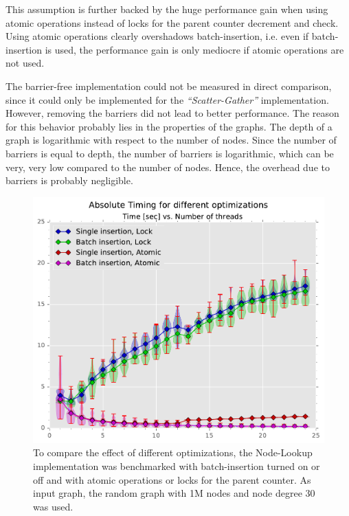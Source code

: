 This assumption is further backed by the huge performance gain when using atomic operations instead of locks for the parent counter decrement and check.
Using atomic operations clearly overshadows batch-insertion, i.e. even if batch-insertion is used, the performance gain is only mediocre if atomic operations are not used.

The barrier-free implementation could not be measured in direct comparison, since it could only be implemented for the \emph{``Scatter-Gather''} implementation.
However, removing the barriers did not lead to better performance. The reason for this behavior probably lies in the properties of the graphs.
The depth of a graph is logarithmic with respect to the number of nodes. Since the number of barriers is equal to depth, the number of barriers is logarithmic, which can be very, very low compared to the number of nodes.
Hence, the overhead due to barriers is probably negligible.

\begin{figure}[t]
	\centering
	\includegraphics[width=\columnwidth]{plots/abstiming_gtRANDOMLIN_n1000000_deg30.pdf}
	\caption{To compare the effect of different optimizations, the Node-Lookup implementation was benchmarked with batch-insertion turned on or off and with atomic operations or locks for the parent counter.
	As input graph, the random graph with 1M nodes and node degree 30 was used.}
	\label{fig:abstiming}
\end{figure}


